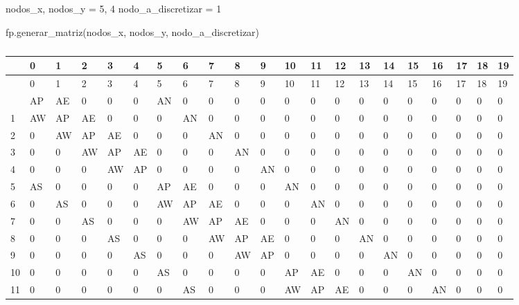 \documentclass[
  letterpaper,
  DIV=11,
  numbers=noendperiod]{scrreprt}
\newenvironment{Shaded}{\begin{snugshade}}{\end{snugshade}}
\newcommand{\DecValTok}[1]{\textcolor[rgb]{0.68,0.00,0.00}{#1}}
\newcommand{\NormalTok}[1]{\textcolor[rgb]{0.00,0.23,0.31}{#1}}
\newcommand{\OperatorTok}[1]{\textcolor[rgb]{0.37,0.37,0.37}{#1}}
\begin{document}
\begin{Shaded}
\begin{Highlighting}[]
\NormalTok{nodos\_x, nodos\_y }\OperatorTok{=} \DecValTok{5}\NormalTok{, }\DecValTok{4}
\NormalTok{nodo\_a\_discretizar }\OperatorTok{=} \DecValTok{1}

\NormalTok{fp.generar\_matriz(nodos\_x, nodos\_y, nodo\_a\_discretizar)}
\end{Highlighting}
\end{Shaded}

\begin{longtable}[]{@{}lllllllllllllllllllll@{}}
\caption{}\label{T_0e862}\tabularnewline
\toprule\noalign{}
~ & 0 & 1 & 2 & 3 & 4 & 5 & 6 & 7 & 8 & 9 & 10 & 11 & 12 & 13 & 14 & 15
& 16 & 17 & 18 & 19 \\
\midrule\noalign{}
\endfirsthead
\toprule\noalign{}
~ & 0 & 1 & 2 & 3 & 4 & 5 & 6 & 7 & 8 & 9 & 10 & 11 & 12 & 13 & 14 & 15
& 16 & 17 & 18 & 19 \\
\midrule\noalign{}
\endhead
\bottomrule\noalign{}
\endlastfoot
0 & AP & AE & 0 & 0 & 0 & AN & 0 & 0 & 0 & 0 & 0 & 0 & 0 & 0 & 0 & 0 & 0
& 0 & 0 & 0 \\
1 & AW & AP & AE & 0 & 0 & 0 & AN & 0 & 0 & 0 & 0 & 0 & 0 & 0 & 0 & 0 &
0 & 0 & 0 & 0 \\
2 & 0 & AW & AP & AE & 0 & 0 & 0 & AN & 0 & 0 & 0 & 0 & 0 & 0 & 0 & 0 &
0 & 0 & 0 & 0 \\
3 & 0 & 0 & AW & AP & AE & 0 & 0 & 0 & AN & 0 & 0 & 0 & 0 & 0 & 0 & 0 &
0 & 0 & 0 & 0 \\
4 & 0 & 0 & 0 & AW & AP & 0 & 0 & 0 & 0 & AN & 0 & 0 & 0 & 0 & 0 & 0 & 0
& 0 & 0 & 0 \\
5 & AS & 0 & 0 & 0 & 0 & AP & AE & 0 & 0 & 0 & AN & 0 & 0 & 0 & 0 & 0 &
0 & 0 & 0 & 0 \\
6 & 0 & AS & 0 & 0 & 0 & AW & AP & AE & 0 & 0 & 0 & AN & 0 & 0 & 0 & 0 &
0 & 0 & 0 & 0 \\
7 & 0 & 0 & AS & 0 & 0 & 0 & AW & AP & AE & 0 & 0 & 0 & AN & 0 & 0 & 0 &
0 & 0 & 0 & 0 \\
8 & 0 & 0 & 0 & AS & 0 & 0 & 0 & AW & AP & AE & 0 & 0 & 0 & AN & 0 & 0 &
0 & 0 & 0 & 0 \\
9 & 0 & 0 & 0 & 0 & AS & 0 & 0 & 0 & AW & AP & 0 & 0 & 0 & 0 & AN & 0 &
0 & 0 & 0 & 0 \\
10 & 0 & 0 & 0 & 0 & 0 & AS & 0 & 0 & 0 & 0 & AP & AE & 0 & 0 & 0 & AN &
0 & 0 & 0 & 0 \\
11 & 0 & 0 & 0 & 0 & 0 & 0 & AS & 0 & 0 & 0 & AW & AP & AE & 0 & 0 & 0 &
AN & 0 & 0 & 0 \\

\end{longtable}
\end{document}
